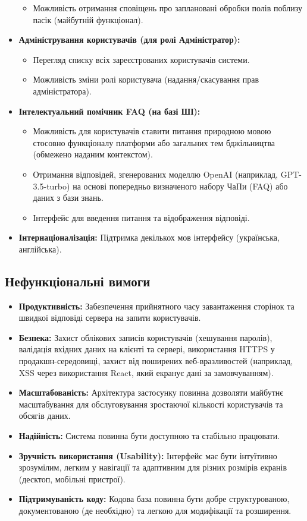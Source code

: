 \begin{itemize}
\begin{itemize}
            \item Можливість отримання сповіщень про заплановані обробки полів поблизу пасік (майбутній функціонал).
        \end{itemize}
    \item \textbf{Адміністрування користувачів (для ролі Адміністратор):}
        \begin{itemize}
            \item Перегляд списку всіх зареєстрованих користувачів системи.
            \item Можливість зміни ролі користувача (надання/скасування прав адміністратора).
        \end{itemize}
    \item \textbf{Інтелектуальний помічник FAQ (на базі ШІ):}
        \begin{itemize}
            \item Можливість для користувачів ставити питання природною мовою стосовно функціоналу платформи або загальних тем бджільництва (обмежено наданим контекстом).
            \item Отримання відповідей, згенерованих моделлю OpenAI (наприклад, GPT-3.5-turbo) на основі попередньо визначеного набору ЧаПи (FAQ) або даних з бази знань.
            \item Інтерфейс для введення питання та відображення відповіді.
        \end{itemize}
    \item \textbf{Інтернаціоналізація:} Підтримка декількох мов інтерфейсу (українська, англійська).
\end{itemize}

\subsection{Нефункціональні вимоги}
\begin{itemize}
    \item \textbf{Продуктивність:} Забезпечення прийнятного часу завантаження сторінок та швидкої відповіді сервера на запити користувачів.
    \item \textbf{Безпека:} Захист облікових записів користувачів (хешування паролів), валідація вхідних даних на клієнті та сервері, використання HTTPS у продакшн-середовищі, захист від поширених веб-вразливостей (наприклад, XSS через використання React, який екранує дані за замовчуванням).
    \item \textbf{Масштабованість:} Архітектура застосунку повинна дозволяти майбутнє масштабування для обслуговування зростаючої кількості користувачів та обсягів даних.
    \item \textbf{Надійність:} Система повинна бути доступною та стабільно працювати.
    \item \textbf{Зручність використання (Usability):} Інтерфейс має бути інтуїтивно зрозумілим, легким у навігації та адаптивним для різних розмірів екранів (десктоп, мобільні пристрої).
    \item \textbf{Підтримуваність коду:} Кодова база повинна бути добре структурованою, документованою (де необхідно) та легкою для модифікації та розширення.
\end{itemize}

